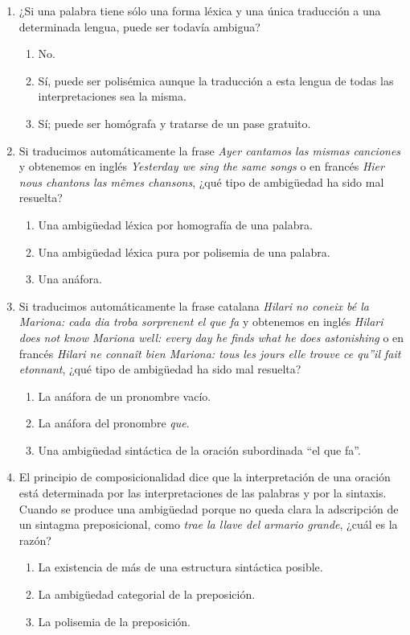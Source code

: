 \begin{enumerate}
\item ¿Si una palabra tiene sólo una forma léxica y una única traducción a una determinada lengua, puede ser todavía ambigua? \begin{enumerate} \item No. \item Sí, puede ser polisémica aunque la traducción a esta lengua de todas las interpretaciones sea la misma. \item Sí; puede ser homógrafa y tratarse de un pase gratuito. \end{enumerate} 

\item Si traducimos automáticamente la frase \emph{Ayer cantamos las mismas canciones} y obtenemos en inglés \emph{Yesterday we sing the same songs} o en francés \emph{Hier nous chantons las mêmes chansons}, ¿qué tipo de ambigüedad ha sido mal resuelta? \begin{enumerate} \item Una ambigüedad léxica por homografía de una palabra. \item Una ambigüedad léxica pura por polisemia de una palabra. \item Una anáfora. \end{enumerate} 

\item Si traducimos automáticamente la frase catalana \emph{Hilari no coneix bé la Mariona: cada dia troba sorprenent el que fa} y obtenemos en inglés \emph{Hilari does not know Mariona well: every day he finds what he does astonishing} o en francés \emph{Hilari ne connaît bien Mariona: tous les jours elle trouve ce qu''il fait etonnant}, ¿qué tipo de ambigüedad ha sido mal resuelta? \begin{enumerate} \item La anáfora de un pronombre vacío. \item La anáfora del pronombre \emph{que}. \item Una ambigüedad sintáctica de la oración subordinada ``el que fa''. \end{enumerate} 

\item El principio de composicionalidad dice que la interpretación de una oración está determinada por las interpretaciones de las palabras y por la sintaxis. Cuando se produce una ambigüedad porque no queda clara la adscripción de un sintagma preposicional, como \emph{trae la llave del armario grande}, ¿cuál es la razón? \begin{enumerate} \item La existencia de más de una estructura sintáctica posible. \item La ambigüedad categorial de la preposición. \item La polisemia de la preposición. \end{enumerate} 


\end{enumerate}
